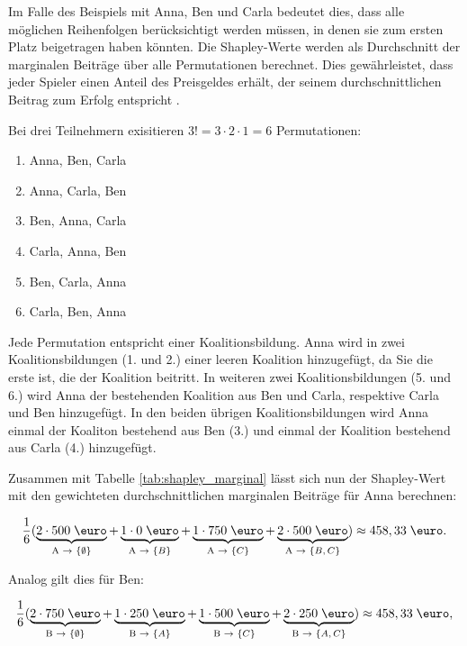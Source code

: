 Im Falle des Beispiels mit Anna, Ben und Carla bedeutet dies, dass alle möglichen Reihenfolgen 
berücksichtigt werden müssen, in denen sie zum ersten Platz beigetragen haben könnten. 
Die Shapley-Werte werden als Durchschnitt der marginalen Beiträge über alle Permutationen berechnet. 
Dies gewährleistet, dass jeder Spieler einen Anteil des Preisgeldes erhält, der seinem durchschnittlichen 
Beitrag zum Erfolg entspricht \cite[S. 20]{Molnar_2023}.

Bei drei Teilnehmern exisitieren $3! = 3 \cdot 2 \cdot 1 = 6$ Permutationen:

\begin{enumerate}[itemsep=0pt, parsep=0pt]
  \item Anna, Ben, Carla
  \item Anna, Carla, Ben
  \item Ben, Anna, Carla
  \item Carla, Anna, Ben
  \item Ben, Carla, Anna
  \item Carla, Ben, Anna
\end{enumerate}

Jede Permutation entspricht einer Koalitionsbildung. Anna wird in zwei Koalitionsbildungen (1. und 2.) einer leeren Koalition hinzugefügt, da Sie die erste ist, 
die der Koalition beitritt.
In weiteren zwei Koalitionsbildungen (5. und 6.) wird Anna der bestehenden Koalition aus Ben und Carla, respektive Carla und Ben hinzugefügt. 
In den beiden übrigen Koalitionsbildungen wird Anna einmal der Koaliton bestehend aus Ben (3.) und einmal der Koalition bestehend aus Carla (4.)
hinzugefügt. 

Zusammen mit Tabelle \ref{tab:shapley_marginal} lässt sich nun der Shapley-Wert mit den gewichteten durchschnittlichen marginalen Beiträge für Anna berechnen:

\begin{equation}
  \frac{1}{6} ( \underbrace{2 \cdot 500\;\text{\euro}}_{\text{A $\rightarrow$ $\{\emptyset$\}}} + \underbrace{1 \cdot 0\;\text{\euro}}_{\text{A $\rightarrow$ $\{B$\}}} + \underbrace{1 \cdot 750\;\text{\euro}}_{\text{A $\rightarrow$ $\{C$\}}} + \underbrace{2 \cdot 500\;\text{\euro}}_{\text{A $\rightarrow$ $\{B, C$\}}} ) \approx 458,33\;\text{\euro}.  
\label{eq:marginal_anna}
\end{equation}

Analog gilt dies für Ben:

\begin{equation}
  \frac{1}{6} ( \underbrace{2 \cdot 750\;\text{\euro}}_{\text{B $\rightarrow$ $\{\emptyset$\}}} + \underbrace{1 \cdot 250\;\text{\euro}}_{\text{B $\rightarrow$ $\{A$\}}} + \underbrace{1 \cdot 500\;\text{\euro}}_{\text{B $\rightarrow$ $\{C$\}}} + \underbrace{2 \cdot 250\;\text{\euro}}_{\text{B $\rightarrow$ $\{A, C$\}}} ) \approx 458,33\;\text{\euro},  
  \label{eq:marginal_ben}
\end{equation}

